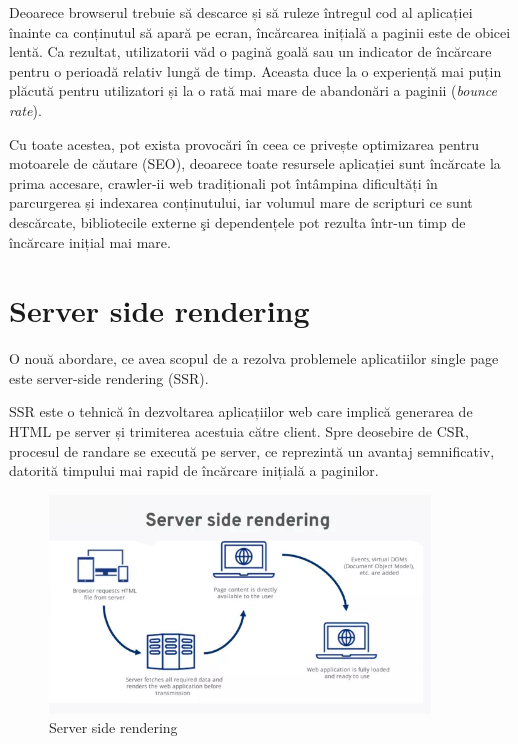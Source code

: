 \documentclass[12pt, a4paper]{report}
\begin{document}

Deoarece browserul trebuie să descarce și să ruleze întregul cod al aplicației înainte ca conținutul să apară pe ecran, încărcarea inițială a paginii este de obicei lentă. Ca rezultat, utilizatorii văd o pagină goală sau un indicator de încărcare pentru o perioadă relativ lungă de timp. Aceasta duce la o experiență mai puțin plăcută pentru utilizatori și la o rată mai mare de abandon\u ari a paginii (\textit{bounce rate}). \cite{google-bouncing-rate}

Cu toate acestea, pot exista provocări în ceea ce privește optimizarea pentru motoarele de căutare (SEO), deoarece toate resursele aplicației sunt \^inc\u arcate la prima accesare, crawler-ii web tradiționali pot întâmpina dificultăți în parcurgerea și indexarea conținutului, iar volumul mare de scripturi ce sunt descărcate, bibliotecile externe \c si dependențele pot rezulta \^intr-un timp de încărcare inițial mai mare.

\section{Server side rendering}

O nou\u a abordare, ce avea scopul de a rezolva problemele aplicatiilor single page este server-side rendering (SSR).

SSR este o tehnică în dezvoltarea aplicațiilor web care implică generarea de HTML pe server și trimiterea acestuia către client. Spre deosebire de CSR, procesul de randare se execut\u a pe server, ce reprezintă un avantaj semnificativ, datorită timpului mai rapid de încărcare inițială a paginilor. \cite{benefitsserverrendering}

\begin{figure}[htbp]
	\centering
	\includegraphics[width=0.9\textwidth]{ssr-diagram.png}
	\caption{Server side rendering \protect\footnotemark}
	\label{fig:ssr-diagram}
\end{figure}
\end{document}
